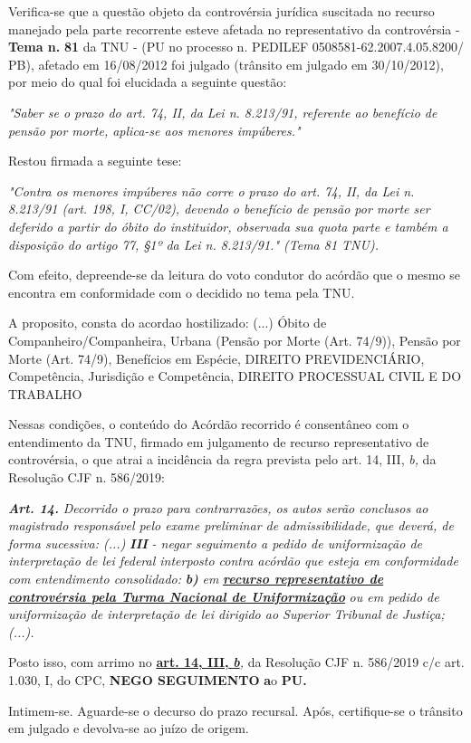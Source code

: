 \documentclass[12pt]{article}
\begin{document}
\justifying
\noindent Verifica-se que a questão objeto da controvérsia jurídica suscitada no recurso manejado pela parte recorrente esteve afetada no representativo da controvérsia - \textbf{Tema n. }\textbf{81} da TNU - (PU no processo n. PEDILEF 0508581-62.2007.4.05.8200/ PB),  afetado em 16/08/2012 foi julgado (trânsito em julgado em 30/10/2012), por meio do qual foi elucidada a seguinte questão:

\noindent \textit{"Saber se o prazo do art. 74, II, da Lei n. 8.213/91, referente ao benefício de pensão por morte, aplica-se aos menores impúberes."}

\noindent Restou firmada a seguinte tese:

\noindent \textit{"Contra os menores impúberes não corre o prazo do art. 74, II, da Lei n. 8.213/91 (art. 198, I, CC/02), devendo o benefício de pensão por morte ser deferido a partir do óbito do instituidor, observada sua quota parte e também a disposição do artigo 77, §1º da Lei n. 8.213/91." (Tema 81 TNU).}

\noindent Com efeito, depreende-se da leitura do voto condutor do acórdão que o mesmo se encontra em conformidade com o decidido no  tema pela TNU.

\noindent A proposito, consta do acordao hostilizado: (...) Óbito de Companheiro/Companheira, Urbana (Pensão por Morte (Art. 74/9)), Pensão por Morte (Art. 74/9), Benefícios em Espécie, DIREITO PREVIDENCIÁRIO, Competência, Jurisdição e Competência, DIREITO PROCESSUAL CIVIL E DO TRABALHO

\noindent Nessas condições, o conteúdo do Acórdão recorrido é consentâneo com o entendimento da TNU, firmado em julgamento de recurso representativo de controvérsia, o que atrai a incidência da regra prevista pelo art. 14, III, \textit{b,} da Resolução CJF n. 586/2019:

\noindent \textit{\textbf{Art. 14.}}\textit{ Decorrido o prazo para contrarrazões, os autos serão conclusos ao magistrado responsável pelo exame preliminar de admissibilidade, que deverá, de forma sucessiva: (...) }\textit{\textbf{III }}\textit{- negar seguimento a pedido de uniformização de interpretação de lei federal interposto contra acórdão que esteja em conformidade com entendimento consolidado: }\textit{\textbf{b)}}\textit{ em }\uline{\textit{\textbf{recurso representativo de controvérsia pela Turma Nacional de Uniformização}}}\textit{ ou em pedido de uniformização de interpretação de lei dirigido ao Superior Tribunal de Justiça;(...).}

\noindent Posto isso, com arrimo no \uline{\textbf{art. 14, III, }}\uline{\textit{\textbf{b}}}\textit{,} da Resolução CJF n. 586/2019 c/c art. 1.030, I, do CPC, \textbf{NEGO SEGUIMENTO }\textbf{a}o\textbf{ PU}\textbf{.}

\noindent Intimem-se. Aguarde-se o decurso do prazo recursal. Após, certifique-se o trânsito em julgado e devolva-se ao juízo de origem.
\end{document}
